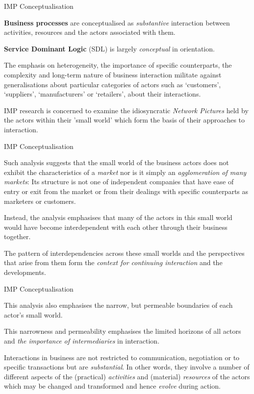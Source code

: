\documentclass{beamer}
\begin{document}
\begin{frame}{IMP Conceptualisation}

\textbf{Business processes} are conceptualised as \emph{substantive}
interaction between activities, resources and the actors associated with them.

\textbf{Service Dominant Logic} (SDL) is largely \emph{conceptual} in
orientation.

The emphasis on heterogeneity, the importance of speciﬁc counterparts, the
complexity and long-term nature of business interaction militate against
generalisations about particular categories of actors such as ‘customers’,
‘suppliers’, ‘manufacturers’ or ‘retailers’, about their interactions.

IMP research is concerned to examine the idiosyncratic \emph{Network Pictures}
held by the actors within their 'small world' which form the basis of their
approaches to interaction.
\end{frame}

\begin{frame}{IMP Conceptualisation}

Such analysis suggests that the small world of the business actors does not
exhibit the characteristics of a \emph{market} nor is it simply an
\emph{agglomeration of many markets}: Its structure is not one of independent
companies that have ease of entry or exit from the market or from their
dealings with speciﬁc counterparts as marketers or customers.

Instead, the analysis emphasises that many of the actors in this small world
would have become interdependent with each other through their business
together.

The pattern of interdependencies across these small worlds and the
perspectives that arise from them form the \emph{context for continuing
  interaction} and the developments.

\end{frame}

\begin{frame}{IMP Conceptualisation}

This analysis also emphasises the narrow, but permeable boundaries of
each actor's small world.

This narrowness and permeability emphasises the limited horizons of all actors
and \emph{the importance of intermediaries} in interaction.

Interactions in business are not restricted to communication, negotiation or
to speciﬁc transactions but are \emph{substantial}. In other words, they
involve a number of different aspects of the (practical) \emph{activities} and
(material) \emph{resources} of the actors which may be changed and transformed
and hence \emph{evolve} during action. 
\end{frame}
\end{document}
